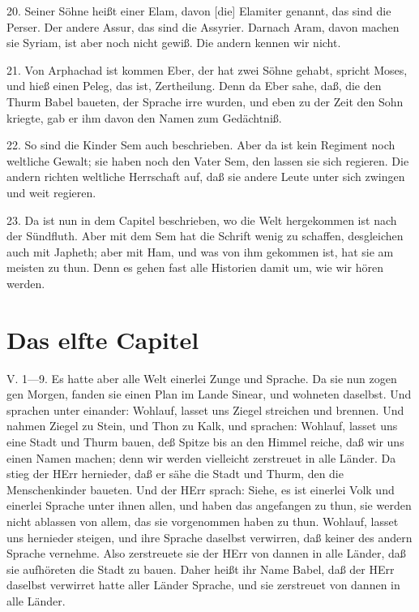 20. Seiner Söhne heißt einer Elam, davon [die] Elamiter genannt, das sind die Perser. Der andere Assur, das sind die Assyrier. Darnach Aram, davon machen sie Syriam, ist aber noch nicht gewiß. Die andern kennen wir nicht.

21. Von Arphachad ist kommen Eber, der hat zwei Söhne gehabt, spricht Moses, und hieß einen Peleg, das ist, Zertheilung. Denn da Eber sahe, daß, die den Thurm Babel baueten, der Sprache irre wurden, und eben zu der Zeit den Sohn kriegte, gab er ihm davon den Namen zum Gedächtniß.

22. So sind die Kinder Sem auch beschrieben. Aber da ist kein Regiment noch weltliche Gewalt; sie haben noch den Vater Sem, den lassen sie sich regieren. Die andern richten weltliche Herrschaft auf, daß sie andere Leute unter sich zwingen und weit regieren.

23. Da ist nun in dem Capitel beschrieben, wo die Welt hergekommen ist nach der Sündfluth. Aber mit dem Sem hat die Schrift wenig zu schaffen, desgleichen auch mit Japheth; aber mit Ham, und was von ihm gekommen ist, hat sie am meisten zu thun. Denn es gehen fast alle Historien damit um, wie wir hören werden.

\section{Das elfte Capitel}

V. 1—9. Es hatte aber alle Welt einerlei Zunge und Sprache. Da sie nun zogen gen Morgen, fanden sie einen Plan im Lande Sinear, und wohneten daselbst. Und sprachen unter einander: Wohlauf, lasset uns Ziegel streichen und brennen. Und nahmen Ziegel zu Stein, und Thon zu Kalk, und sprachen: Wohlauf, lasset uns eine Stadt und Thurm bauen, deß Spitze bis an den Himmel reiche, daß wir uns einen Namen machen; denn wir werden vielleicht zerstreuet in alle Länder. Da stieg der HErr hernieder, daß er sähe die Stadt und Thurm, den die Menschenkinder baueten. Und der HErr sprach: Siehe, es ist einerlei Volk und einerlei Sprache unter ihnen allen, und haben das angefangen zu thun, sie werden nicht ablassen von allem, das sie vorgenommen haben zu thun. Wohlauf, lasset uns hernieder steigen, und ihre Sprache daselbst verwirren, daß keiner des andern Sprache vernehme. Also zerstreuete sie der HErr von dannen in alle Länder, daß sie aufhöreten die Stadt zu bauen. Daher heißt ihr Name Babel, daß der HErr daselbst verwirret hatte aller Länder Sprache, und sie zerstreuet von dannen in alle Länder.


